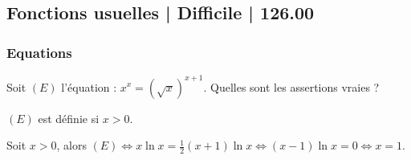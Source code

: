 \subsection{Fonctions usuelles | Difficile | 126.00}

\subsubsection{Equations}

\begin{question} 
Soit $(E)$ l'équation : $ x^x=(\sqrt x)^{x+1}$.  Quelles sont les assertions vraies ?

\begin{answers}

     \good{Le domaine de définition de $(E)$ est $]0,+\infty[$.}
     


\end{answers}
\begin{explanations}
$(E)$ est définie si $x>0$. 

Soit $x>0$, alors $(E) \Leftrightarrow x \ln x  = \frac{1}{2}(x+1)\ln x  \Leftrightarrow (x-1) \ln x = 0 \Leftrightarrow x=1.$
\end{explanations}


\end{question}





